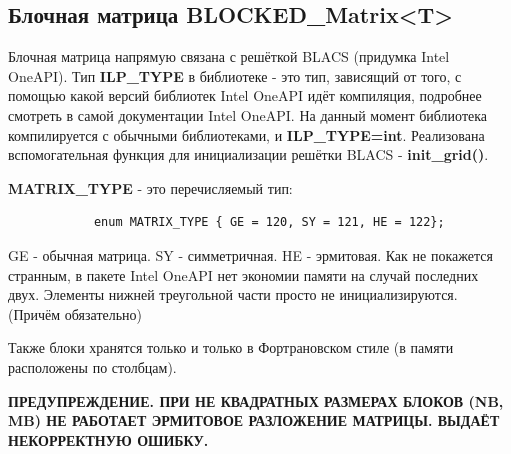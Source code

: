 \documentclass[12pt,fleqn]{article}
\begin{document}
        \subsection{Блочная матрица \textbf{BLOCKED\_Matrix<T>}}

        Блочная матрица напрямую связана с решёткой \textsf{BLACS} (придумка \textsf{Intel OneAPI}). Тип \textbf{ILP\_TYPE} в библиотеке - это тип, зависящий от того, 
        с помощью какой версий библиотек \textsf{Intel OneAPI} идёт компиляция, подробнее смотреть в самой документации \textsf{Intel OneAPI}. На данный момент библиотека компилируется
        с обычными библиотеками, и \textbf{ILP\_TYPE=int}. Реализована вспомогательная функция для инициализации решётки \textsf{BLACS} - \textbf{init\_grid()}.

        \textbf{MATRIX\_TYPE} - это перечисляемый тип:

        \begin{mdframed}[linecolor=black, topline=true, bottomline=true,
            leftline=false, rightline=false]
        \begin{verbatim}
            enum MATRIX_TYPE { GE = 120, SY = 121, HE = 122};
        \end{verbatim}
        \end{mdframed}

        GE - обычная матрица. SY - симметричная. HE - эрмитовая. Как не покажется странным, в пакете Intel OneAPI нет экономии памяти на случай последних двух.
        Элементы нижней треугольной части просто не инициализируются. (Причём обязательно)

        Также блоки хранятся только и только в Фортрановском стиле (в памяти расположены по столбцам).

        \textbf{ПРЕДУПРЕЖДЕНИЕ. ПРИ НЕ КВАДРАТНЫХ РАЗМЕРАХ БЛОКОВ (NB, MB) НЕ РАБОТАЕТ ЭРМИТОВОЕ РАЗЛОЖЕНИЕ МАТРИЦЫ. ВЫДАЁТ НЕКОРРЕКТНУЮ ОШИБКУ.}
\end{document}

